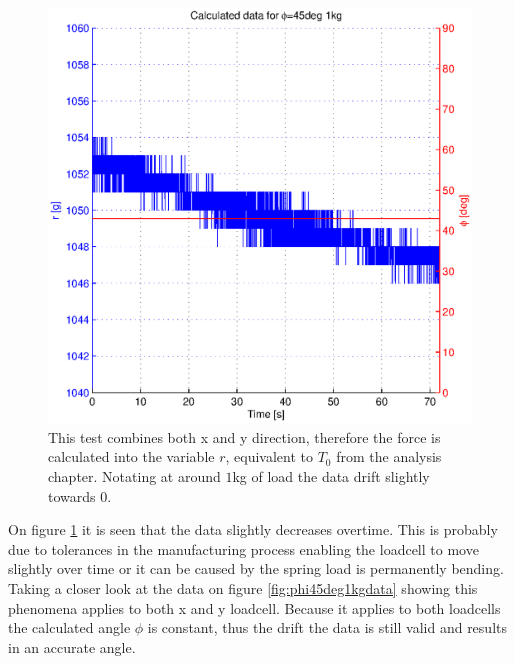 \begin{figure}[H]
\centering
\includegraphics[scale=1]{graphics/gcs_test/phi45deg1kg.eps}
\caption{This test combines both x and y direction, therefore the force is calculated into the variable $r$, equivalent to $T_0$ from the analysis chapter. Notating at around $1$kg of load the data drift slightly towards 0.}
\label{fig:phi45deg1kg}
\end{figure}

\noindent
On figure \ref{fig:phi45deg1kg} it is seen that the data slightly decreases overtime. This is probably due to tolerances in the manufacturing process enabling the loadcell to move slightly over time or it can be caused by the spring load is permanently bending. Taking a closer look at the data on figure \ref{fig:phi45deg1kgdata} showing this phenomena applies to both x and y loadcell. Because it applies to both loadcells the calculated angle $\phi$ is constant, thus the drift the data is still valid and results in an accurate angle.

